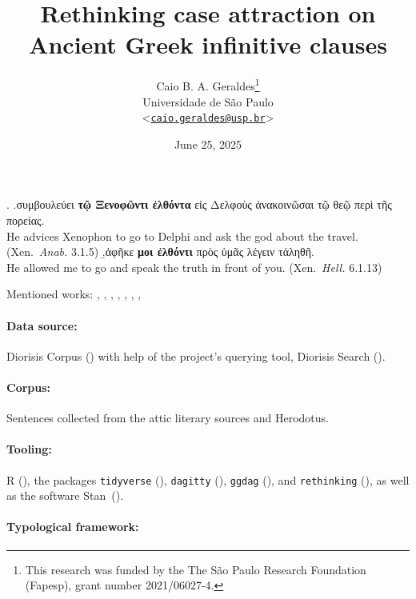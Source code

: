 \documentclass[a4paper, 12pt, article]{memoir}
\title{Rethinking case attraction on Ancient Greek infinitive clauses}
\author{
  Caio B. A. Geraldes\thanks{
		This research was funded by the 
	 The São Paulo Research Foundation (Fapesp), grant number 2021/06027-4.}
	\\\smallskip
	Universidade de São Paulo
	\\\smallskip
	<\href{mailto:caio.geraldes@usp.br}{\texttt{caio.geraldes@usp.br}}>
}
\date{June 25, 2025}
\begin{document}
\maketitle

\ex.
\a.συμβουλεύει \textbf{τῷ Ξενοφῶντι ἐλθόντα} {εἰς Δελφοὺς}
ἀνακοινῶσαι {τῷ θεῷ} {περὶ τῆς πορείας}.\\
He advices Xenophon to go to Delphi and ask the god about the travel.
(Xen.\ \emph{Anab.} 3.1.5)
\b.ἀφῆκε \textbf{μοι ἐλθόντι} {πρὸς ὑμᾶς} λέγειν τἀληθῆ.\\
He allowed me to go and speak the truth in front of you.
(Xen.\ \emph{Hell.} 6.1.13)


\noindent Mentioned works:
\textcite{Lancelot1658,Lancelot1709},
\textcite{Boas2019},
\textcite{Lakoff1970}, \textcite{Andrews1971}, \textcite{Quicoli1982},
\textcite{Spyropoulos2005}, \textcite{Tantalou2003},
\textcite{Sevdali2006,Sevdali2013}

\paragraph{Data source:}  Diorisis Corpus
(\cite{TheDiorisisAncientGreekCorpus,diorisis2021}) with help of the project's
querying tool, Diorisis Search (\cite{DiorisisSearch}).

\paragraph{Corpus:} Sentences collected from the attic literary sources and
Herodotus.

\paragraph{Tooling:} R (\cite{R}), the packages
\texttt{tidyverse} (\cite{tidyverse}), \texttt{dagitty} (\cite{dagitty}),
\texttt{ggdag} (\cite{ggdag}), and \texttt{rethinking} (\cite{McElreath2020}),
as well as the software Stan~(\cite{StanReferenceManual,StanUserGuide}).

\paragraph{Typological framework:} \textcite{Corbett2006}
\end{document}
